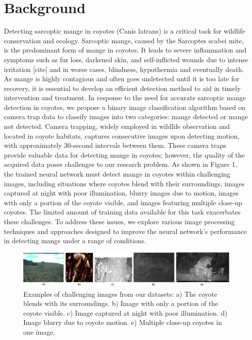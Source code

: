 \documentclass{article}
\begin{document}
\section{Background}
Detecting sarcoptic mange in coyotes (Canis latrans) is a critical task for
wildlife conservation and ecology. Sarcoptic mange, caused by the Sarcoptes
scabei mite, is the predominant form of mange in coyotes. It leads to severe
inflammation and symptoms such as fur loss, darkened skin, and self-inflicted
wounds due to intense irritation [cite] and in worse cases, blindness,
hypothermia and eventually death. As mange is highly contagious and often goes
undetected until it is too late for recovery, it is essential to develop an
efficient detection method to aid in timely intervention and treatment. In
response to the need for accurate sarcoptic mange detection in coyotes, we
propose a binary image classification algorithm based on camera trap data to
classify images into two categories: mange detected or mange not detected.
Camera trapping, widely employed in wildlife observation and located in coyote
habitats, captures consecutive images upon detecting motion, with approximately
30-second intervals between them. These camera traps provide valuable data for
detecting mange in coyotes; however, the quality of the acquired data poses
challenges to our research problem. As shown in Figure 1, the trained neural
network must detect mange in coyotes within challenging images, including
situations where coyotes blend with their surroundings, images captured at night
with poor illumination, blurry images due to motion, images with only a portion
of the coyote visible, and images featuring multiple close-up coyotes. The
limited amount of training data available for this task exacerbates these
challenges. To address these issues, we explore various image processing
techniques and approaches designed to improve the neural network's performance
in detecting mange under a range of conditions.

\begin{figure}
\centering
\includegraphics[width=1.0\textwidth]{fig1.jpeg}
\caption{\label{fig:fig1}Examples of challenging images from our datasets: a)
The coyote blends with its surroundings. b) Image with only a portion of the
coyote visible. c) Image captured at night with poor illumination. d) Image
blurry due to coyote motion. e) Multiple close-up coyotes in one image.}
\end{figure}
\end{document}

